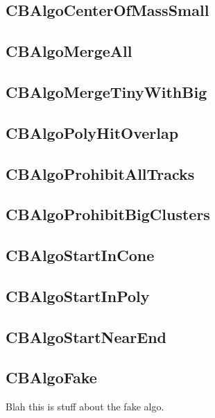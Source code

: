 \documentclass{article}
\begin{document}
\subsection{CBAlgoCenterOfMassSmall}\label{sec:CBAlgoCenterOfMassSmall}
\subsection{CBAlgoMergeAll}\label{sec:CBAlgoMergeAll}
\subsection{CBAlgoMergeTinyWithBig}\label{sec:CBAlgoMergeTinyWithBig}
\subsection{CBAlgoPolyHitOverlap}\label{sec:CBAlgoPolyHitOverlap}
\subsection{CBAlgoProhibitAllTracks}\label{sec:CBAlgoProhibitAllTracks}
\subsection{CBAlgoProhibitBigClusters}\label{sec:CBAlgoProhibitBigClusters}
\subsection{CBAlgoStartInCone}\label{sec:CBAlgoStartInCone}
\subsection{CBAlgoStartInPoly}\label{sec:CBAlgoStartInPoly}
\subsection{CBAlgoStartNearEnd}\label{sec:CBAlgoStartNearEnd}


\subsection{CBAlgoFake}
\label{sec:CBAlgoFake}
Blah this is stuff about the fake algo.
\end{document}
